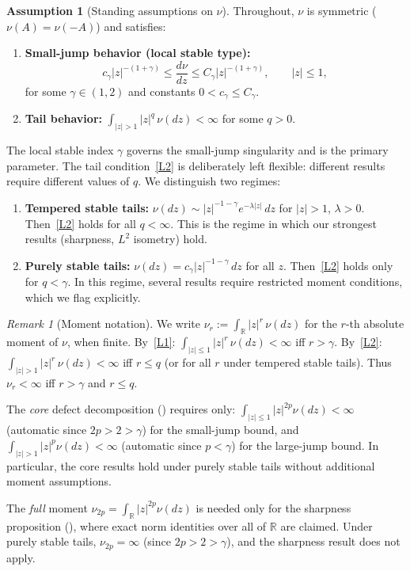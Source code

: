 \documentclass[11pt,a4paper]{article}
\theoremstyle{plain}
\theoremstyle{definition}
\newtheorem{assumption}[theorem]{Assumption}
\theoremstyle{remark}
\newtheorem{remark}[theorem]{Remark}
\newcommand{\R}{\mathbb{R}}
\begin{document}
\begin{assumption}[Standing assumptions on $\nu$]\label{ass:nu}
Throughout, $\nu$ is symmetric ($\nu(A) = \nu(-A)$) and satisfies:
\begin{enumerate}[label=(L\arabic*)]
\item\label{L1} \textbf{Small-jump behavior (local stable type):}
  \[
    c_\gamma |z|^{-(1+\gamma)} \leq \frac{d\nu}{dz} \leq
    C_\gamma |z|^{-(1+\gamma)}, \qquad |z| \leq 1,
  \]
  for some $\gamma \in (1,2)$ and constants
  $0 < c_\gamma \leq C_\gamma$.
\item\label{L2} \textbf{Tail behavior:}
  $\int_{|z|>1} |z|^q\,\nu(dz) < \infty$ for some $q > 0$.
\end{enumerate}
The local stable index $\gamma$ governs the small-jump singularity
and is the primary parameter.  The tail condition~\ref{L2} is
deliberately left flexible: different results require different
values of $q$.  We distinguish two regimes:
\begin{enumerate}[label=(\alph*)]
\item \textbf{Tempered stable tails:}
  $\nu(dz) \sim |z|^{-1-\gamma}e^{-\lambda|z|}\,dz$ for
  $|z| > 1$, $\lambda > 0$.  Then~\ref{L2} holds for all
  $q < \infty$.  This is the regime in which our strongest
  results (sharpness, $L^2$ isometry) hold.
\item \textbf{Purely stable tails:}
  $\nu(dz) = c_\gamma|z|^{-1-\gamma}\,dz$ for all $z$.
  Then~\ref{L2} holds only for $q < \gamma$.  In this regime,
  several results require restricted moment conditions,
  which we flag explicitly.
\end{enumerate}
\end{assumption}

\begin{remark}[Moment notation]\label{rem:moments}
We write $\nu_r := \int_\R |z|^r\,\nu(dz)$ for the $r$-th
absolute moment of $\nu$, when finite.  By~\ref{L1}:
$\int_{|z|\leq 1}|z|^r\,\nu(dz) < \infty$ iff $r > \gamma$.
By~\ref{L2}: $\int_{|z|>1}|z|^r\,\nu(dz) < \infty$ iff
$r \leq q$ (or for all $r$ under tempered stable tails).
Thus $\nu_r < \infty$ iff $r > \gamma$ and $r \leq q$.

The \emph{core} defect decomposition
() requires only:
$\int_{|z|\leq 1}|z|^{2p}\nu(dz) < \infty$ (automatic since
$2p > 2 > \gamma$) for the small-jump bound, and
$\int_{|z|>1}|z|^p\nu(dz) < \infty$ (automatic since
$p < \gamma$) for the large-jump bound.  In particular,
the core results hold under purely stable tails
without additional moment assumptions.

The \emph{full} moment $\nu_{2p} = \int_\R|z|^{2p}\nu(dz)$
is needed only for the sharpness proposition
(), where exact norm identities over
all of $\R$ are claimed.  Under purely stable tails,
$\nu_{2p} = \infty$ (since $2p > 2 > \gamma$), and the
sharpness result does not apply.
\end{remark}
\end{document}
